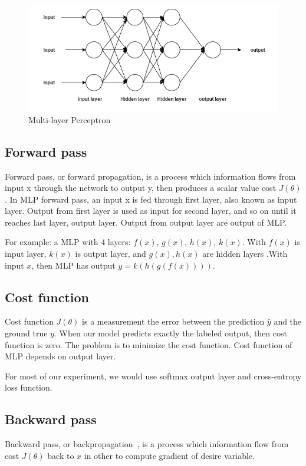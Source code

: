\begin{figure}[H]
	\centering
	\includegraphics[width=0.7\linewidth]{figure/multilayerperceptron}
	\caption[Multi-layer Perceptron]{Multi-layer Perceptron}
	\label{fig:multilayerperceptron}
\end{figure}

\subsection{Forward pass}
Forward pass, or forward propagation, is a process which information flows from input x through the network to output y, then produces a scalar value cost $J(\theta)$. 
In MLP forward pass, an input x is fed through first layer, also known as input layer. 
Output from first layer is used as input for second layer, and so on until it reaches last layer, output layer. Output from output layer are output of MLP.

For example: a MLP with 4 layers: $f(x)$, $g(x)$, $h(x)$, $k(x)$. With $f(x)$ is input layer, $k(x)$ is output layer, and $g(x), h(x)$ are hidden layers .With input $x$, then MLP has output $ y = k(h(g(f(x))))$.

\subsection{Cost function}
Cost function $J(\theta)$  is a measurement the error between the prediction $\hat y$ and the ground true $y$. 
When our model predicts exactly the labeled output, then cost function is zero. The problem is to minimize the cost function. 
Cost function of MLP depends on output layer.

For most of our experiment, we would use softmax output layer and cross-entropy loss function.

\subsection{Backward pass}
Backward pass, or backpropagation~\cite{rumelhart1988learning}, is a process which information flow from cost $J(\theta)$ back to $x$ in other to compute gradient of desire variable.


